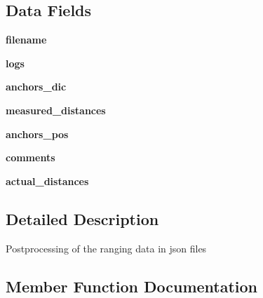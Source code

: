 \subsection*{Data Fields}
\begin{DoxyCompactItemize}
\item 
\mbox{\label{classread_rangings_1_1_rangings_a2ff994e16bf9521154de4cf659a3b689}} 
{\bfseries filename}
\item 
\mbox{\label{classread_rangings_1_1_rangings_a37d874d1d45bc2e5bfa013cddacb8e68}} 
{\bfseries logs}
\item 
\mbox{\label{classread_rangings_1_1_rangings_ac74f5fdcc1c338a24cba634a4f16a1b6}} 
{\bfseries anchors\+\_\+dic}
\item 
\mbox{\label{classread_rangings_1_1_rangings_adab92eab4a26d12a723b31471ffc8241}} 
{\bfseries measured\+\_\+distances}
\item 
\mbox{\label{classread_rangings_1_1_rangings_a5b68d6d2c91370ca44cee7699a3cb1fd}} 
{\bfseries anchors\+\_\+pos}
\item 
\mbox{\label{classread_rangings_1_1_rangings_a64b8b36116751d566275b722e40bb3a7}} 
{\bfseries comments}
\item 
\mbox{\label{classread_rangings_1_1_rangings_a011ffe4ae9802b535701e516a805de4d}} 
{\bfseries actual\+\_\+distances}
\end{DoxyCompactItemize}


\subsection{Detailed Description}
\begin{DoxyVerb}Postprocessing of the ranging data in json files\end{DoxyVerb}
 

\subsection{Member Function Documentation}
\mbox{\label{classread_rangings_1_1_rangings_ae9f85ff6eeb7be193c52d772e6aeacfb}} 
